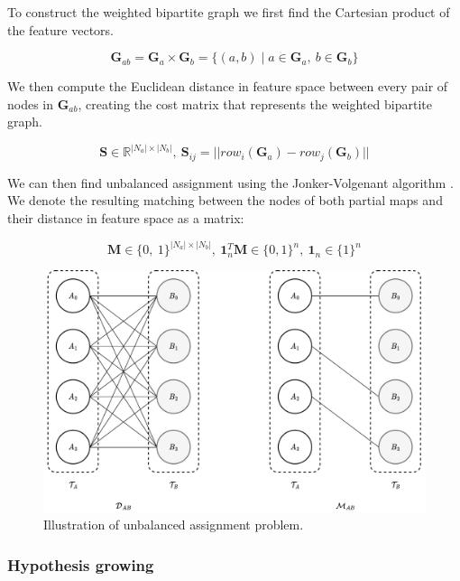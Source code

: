 To construct the weighted bipartite graph we first find the Cartesian product of the feature vectors.

\begin{equation}
    \label{eq:E_ab}
    \mathbf{G}_{ab} = \mathbf{G}_a \times \mathbf{G}_b = \{(a,b) \mid a \in \mathbf{G}_a,\ b \in \mathbf{G}_b\}
\end{equation}

We then compute the Euclidean distance in feature space between every pair of nodes in \(\mathbf{G}_{ab}\), creating the cost matrix that represents the weighted bipartite graph.

\begin{equation}
    \label{eq:C}
    \mathbf{S} \in \mathbb{R}^{|N_a| \times |N_b|},\ \mathbf{S}_{ij} = ||row_i(\mathbf{G}_a) - row_j(\mathbf{G}_b)||
\end{equation}


We can then find unbalanced assignment using the Jonker-Volgenant algorithm \citep{jonker_shortest_1987}. We denote the resulting matching between the nodes of both partial maps and their distance in feature space as a matrix:

\begin{equation}
    \label{eq:M}
    \mathbf{M} \in \{0,\ 1\}^{|N_a| \times |N_b|},\  \mathbf{1}_n^T\mathbf{M}
 \in \{0,1\}^n,\ \mathbf{1}_n \in \{1\}^n
\end{equation}

\begin{figure}[h]
    \centering
    \includegraphics*[width=.9\textwidth]{./fig/assignment.drawio.pdf}
    \caption{Illustration of unbalanced assignment problem.}
    \label{fig:assignment}
\end{figure}

\subsubsection{Hypothesis growing}

